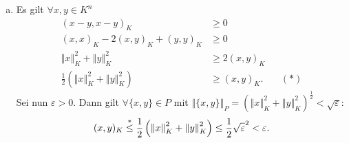 \documentclass{article}
\theoremstyle{definition}
\newcommand{\norm}[1]{\left\Vert #1 \right\Vert}
\let\oldstackrel\stackrel
\renewcommand{\stackrel}[2]{%
    \oldstackrel{\mathclap{#1}}{#2}
}%
\renewcommand{\epsilon}{\varepsilon}
\begin{document}
\begin{enumerate}[(a)]
\begin{enumerate}[(i)]
	\end{enumerate}
	\item Es gilt $\forall x, y \in K^n$ \begin{align*}
		(x-y,x-y)_K &\geq 0\\
		(x,x)_K - 2(x,y)_K + (y,y)_K &\geq 0\\
		\norm{x}_K^2 + \norm{y}_K^2 &\geq 2(x,y)_K\\
		\frac{1}{2}\left(\norm{x}_K^2 + \norm{y}_K^2\right) &\geq (x,y)_K. &&(*)
	\end{align*}
	Sei nun $\epsilon > 0$. Dann gilt $\forall \{x,y\}\in P$ mit $\norm{\{x,y\}}_P = \left(\norm{x}_K^2 + \norm{y}_K^2\right)^\frac{1}{2} < \sqrt{\epsilon}$:
	\[
		(x,y)_K \stackrel{*}{\leq} \frac{1}{2}\left(\norm{x}_K^2 + \norm{y}_K^2\right) \leq \frac{1}{2} \sqrt{\epsilon}^2 < \epsilon.
	\]
\end{enumerate}
\end{document}
